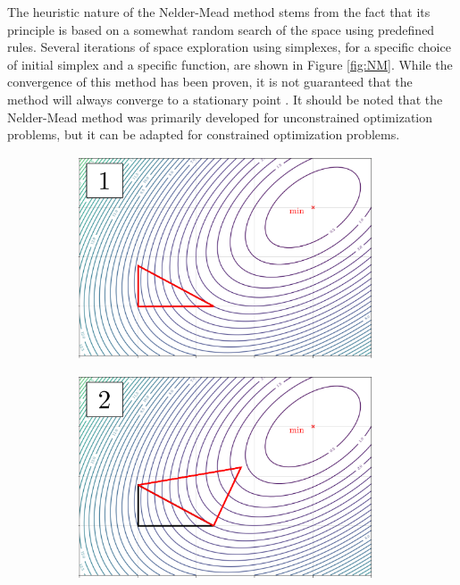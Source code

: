 %
The heuristic nature of the Nelder-Mead method stems from the fact that its principle is based on a somewhat random search of the space using predefined rules. Several iterations of space exploration using simplexes, for a specific choice of initial simplex and a specific function, are shown in Figure \ref{fig:NM}. While the convergence of this method has been proven, it is not guaranteed that the method will always converge to a stationary point \cite{BBO-textbook}. It should be noted that the Nelder-Mead method was primarily developed for unconstrained optimization problems, but it can be adapted for constrained optimization problems.


\begin{figure}[H]
	\vspace{-5mm}
	\begin{subfigure}[b]{0.32\textwidth}
		\centering
		\includegraphics[width=0.96\textwidth, trim={0 0 0 0}, clip]{figures/nelder1.pdf}
	\end{subfigure}
	\begin{subfigure}[b]{0.32\textwidth}
		\centering
		\includegraphics[width=0.96\textwidth, trim={0 0 0 0}]{figures/nelder2.pdf}

\end{subfigure}
\end{figure}
